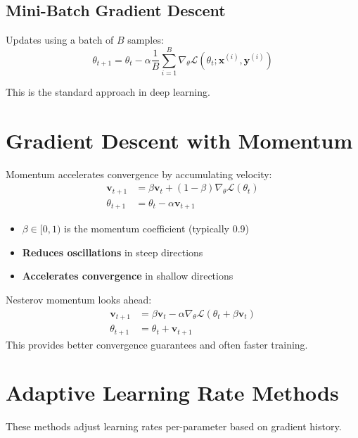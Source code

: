 \subsection{Mini-Batch Gradient Descent}

Updates using a batch of $B$ samples:
\begin{equation}
\theta_{t+1} = \theta_t - \alpha \frac{1}{B}\sum_{i=1}^{B}\nabla_\theta \mathcal{L}(\theta_t; \mathbf{x}^{(i)}, \mathbf{y}^{(i)})
\end{equation}

This is the standard approach in deep learning.

\section{Gradient Descent with Momentum}

Momentum accelerates convergence by accumulating velocity:
\begin{align}
\mathbf{v}_{t+1} &= \beta \mathbf{v}_t + (1-\beta)\nabla_\theta \mathcal{L}(\theta_t) \\
\theta_{t+1} &= \theta_t - \alpha \mathbf{v}_{t+1}
\end{align}

\begin{itemize}
    \item $\beta \in [0, 1)$ is the momentum coefficient (typically 0.9)
    \item \textbf{Reduces oscillations} in steep directions
    \item \textbf{Accelerates convergence} in shallow directions
\end{itemize}

\begin{note}
Nesterov momentum looks ahead:
\begin{align}
\mathbf{v}_{t+1} &= \beta \mathbf{v}_t - \alpha \nabla_\theta \mathcal{L}(\theta_t + \beta\mathbf{v}_t) \\
\theta_{t+1} &= \theta_t + \mathbf{v}_{t+1}
\end{align}
This provides better convergence guarantees and often faster training.
\end{note}

\section{Adaptive Learning Rate Methods}

These methods adjust learning rates per-parameter based on gradient history.

